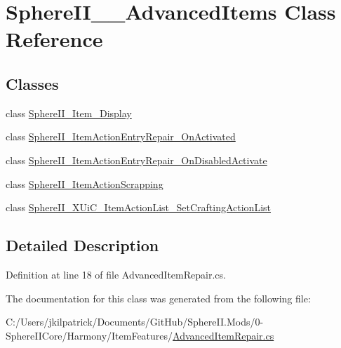\hypertarget{class_sphere_i_i_____advanced_items}{}\section{Sphere\+I\+I\+\_\+\+\_\+\+Advanced\+Items Class Reference}
\label{class_sphere_i_i_____advanced_items}
\subsection*{Classes}
\begin{DoxyCompactItemize}
\item 
class \mbox{\hyperlink{class_sphere_i_i_____advanced_items_1_1_sphere_i_i___item___display}{Sphere\+I\+I\+\_\+\+Item\+\_\+\+Display}}
\item 
class \mbox{\hyperlink{class_sphere_i_i_____advanced_items_1_1_sphere_i_i___item_action_entry_repair___on_activated}{Sphere\+I\+I\+\_\+\+Item\+Action\+Entry\+Repair\+\_\+\+On\+Activated}}
\item 
class \mbox{\hyperlink{class_sphere_i_i_____advanced_items_1_1_sphere_i_i___item_action_entry_repair___on_disabled_activate}{Sphere\+I\+I\+\_\+\+Item\+Action\+Entry\+Repair\+\_\+\+On\+Disabled\+Activate}}
\item 
class \mbox{\hyperlink{class_sphere_i_i_____advanced_items_1_1_sphere_i_i___item_action_scrapping}{Sphere\+I\+I\+\_\+\+Item\+Action\+Scrapping}}
\item 
class \mbox{\hyperlink{class_sphere_i_i_____advanced_items_1_1_sphere_i_i___x_ui_c___item_action_list___set_crafting_action_list}{Sphere\+I\+I\+\_\+\+X\+Ui\+C\+\_\+\+Item\+Action\+List\+\_\+\+Set\+Crafting\+Action\+List}}
\end{DoxyCompactItemize}


\subsection{Detailed Description}


Definition at line 18 of file Advanced\+Item\+Repair.\+cs.



The documentation for this class was generated from the following file\+:\begin{DoxyCompactItemize}
\item 
C\+:/\+Users/jkilpatrick/\+Documents/\+Git\+Hub/\+Sphere\+I\+I.\+Mods/0-\/\+Sphere\+I\+I\+Core/\+Harmony/\+Item\+Features/\mbox{\hyperlink{_advanced_item_repair_8cs}{Advanced\+Item\+Repair.\+cs}}\end{DoxyCompactItemize}
